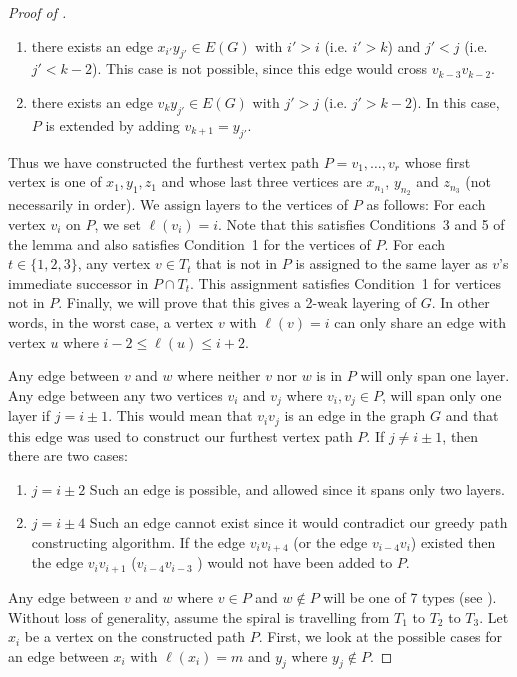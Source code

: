 \documentclass{patmorin}
\begin{document}
\begin{proof}[Proof of ]
\begin{enumerate}
  \item there exists an edge $x_{i'}y_{j'}\in E(G)$ with $i' > i$
    (i.e. $i' > k$) and $j'< j$ (i.e. $j'< k-2$).  This case is not possible, since this edge would cross $v_{k-3}v_{k-2}$.

  \item there exists an edge $v_k y_{j'}\in E(G)$ with $j' >j$  (i.e. $j'> k-2$).  In this case, $P$ is extended by adding $v_{k+1}=y_{j'}$.
  \end{enumerate}


  Thus we have constructed the furthest vertex path $P=v_1,\ldots,v_r$ whose first vertex is one of
  $x_1,y_1,z_1$ and whose last three vertices are $x_{n_1}$,
  $y_{n_2}$ and $z_{n_3}$ (not necessarily in order).  We assign layers
  to the vertices of $P$ as follows: For each vertex $v_i$ on $P$,
  we set $\ell(v_i)=i$.  Note that this satisfies Conditions~3 and 5
  of the lemma and also satisfies Condition~1 for the vertices of $P$.
  For each $t\in\{1,2,3\}$, any vertex $v\in T_t$ that is not in
  $P$ is assigned to the same layer as $v$'s immediate successor in $P\cap T_t$.
  This assignment satisfies Condition~1 for vertices not in $P$.
  Finally, we will prove that this gives a 2-weak layering of $G$. In other words,
  in the worst case, a vertex $v$ with $\ell(v)=i$ can only share an edge with vertex $u$ where  $i-2 \le \ell(u) \le i+2$.

 Any edge between $v$ and $w$ where neither $v$ nor $w$ is in $P$ will only span one layer.
 Any edge between any two vertices $v_i$ and $v_j$ where $v_i, v_j \in P$, will span only one layer if $j = i\pm1$.
 This would mean that $v_{i}v_{j}$ is an edge in the graph $G$
 and that this edge was used to construct our furthest vertex path $P$.
 If $j \neq i\pm1$, then there are two cases:
   \begin{enumerate}
	\item $j = i \pm 2$ Such an edge is possible, and allowed since it spans only two layers. %
	\item $j = i \pm 4$ Such an edge cannot exist since it would contradict our greedy path constructing algorithm.
	If the edge $v_iv_{i+4}$ (or the edge $v_{i-4}v_i$) existed then the edge $v_i v_{i+1}$ ($v_{i-4}v_{i-3}$ ) would not have been added to $P$.
   \end{enumerate}

 Any edge between $v$ and $w$ where $v \in P$ and $w \not\in P$ will be one of 7 types (see ).
 Without loss of generality, assume the spiral is travelling from $T_1$ to $T_2$ to $T_3$. Let $x_i$ be a vertex on the constructed path $P$.
 First, we look at the possible cases for an edge between $x_i$ with $\ell(x_i) = m$ and $y_j$ where $y_j \notin P$.



\end{proof}
\end{document}

